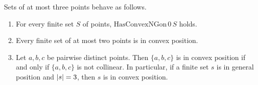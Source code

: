 \begin{lemma}\label{fd:lem:small}\sloppy
Sets of at most three points behave as follows.
\begin{enumerate}[label=(\alph*)]
\item For every finite set $S$ of points, $\mathrm{HasConvexNGon}\,0\,S$ holds.
\item Every finite set of at most two points is in convex position.
\item Let $a,b,c$ be pairwise distinct points. Then $\{a,b,c\}$ is in convex position if and only if
  $\{a,b,c\}$ is not collinear. In particular, if a finite set $s$ is in general position and
  $\lvert s\rvert=3$, then $s$ is in convex position.
\end{enumerate}
\end{lemma}

